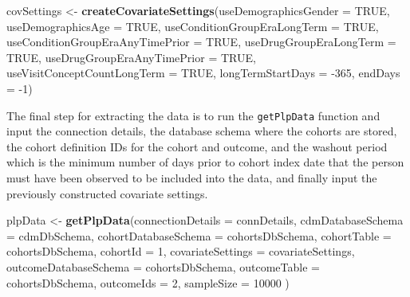 \documentclass[11pt]{book}
\newenvironment{Shaded}{\begin{snugshade}}{\end{snugshade}}
\newcommand{\DataTypeTok}[1]{\textcolor[rgb]{0.13,0.29,0.53}{#1}}
\newcommand{\DecValTok}[1]{\textcolor[rgb]{0.00,0.00,0.81}{#1}}
\newcommand{\KeywordTok}[1]{\textcolor[rgb]{0.13,0.29,0.53}{\textbf{#1}}}
\newcommand{\NormalTok}[1]{#1}
\newcommand{\OtherTok}[1]{\textcolor[rgb]{0.56,0.35,0.01}{#1}}
\newcommand{\StringTok}[1]{\textcolor[rgb]{0.31,0.60,0.02}{#1}}
\theoremstyle{definition}
\theoremstyle{definition}
\theoremstyle{definition}
\theoremstyle{remark}
\begin{document}
\begin{Shaded}
\begin{Highlighting}[]
\NormalTok{covSettings <-}\StringTok{ }\KeywordTok{createCovariateSettings}\NormalTok{(}\DataTypeTok{useDemographicsGender =} \OtherTok{TRUE}\NormalTok{,}
                                       \DataTypeTok{useDemographicsAge =} \OtherTok{TRUE}\NormalTok{,}
                                       \DataTypeTok{useConditionGroupEraLongTerm =} \OtherTok{TRUE}\NormalTok{,}
                                       \DataTypeTok{useConditionGroupEraAnyTimePrior =} \OtherTok{TRUE}\NormalTok{,}
                                       \DataTypeTok{useDrugGroupEraLongTerm =} \OtherTok{TRUE}\NormalTok{,}
                                       \DataTypeTok{useDrugGroupEraAnyTimePrior =} \OtherTok{TRUE}\NormalTok{,}
                                       \DataTypeTok{useVisitConceptCountLongTerm =} \OtherTok{TRUE}\NormalTok{,}
                                       \DataTypeTok{longTermStartDays =} \DecValTok{-365}\NormalTok{,}
                                       \DataTypeTok{endDays =} \DecValTok{-1}\NormalTok{)}
\end{Highlighting}
\end{Shaded}

The final step for extracting the data is to run the \texttt{getPlpData} function and input the connection details, the database schema where the cohorts are stored, the cohort definition IDs for the cohort and outcome, and the washout period which is the minimum number of days prior to cohort index date that the person must have been observed to be included into the data, and finally input the previously constructed covariate settings.

\begin{Shaded}
\begin{Highlighting}[]
\NormalTok{plpData <-}\StringTok{ }\KeywordTok{getPlpData}\NormalTok{(}\DataTypeTok{connectionDetails =}\NormalTok{ connDetails,}
                      \DataTypeTok{cdmDatabaseSchema =}\NormalTok{ cdmDbSchema,}
                      \DataTypeTok{cohortDatabaseSchema =}\NormalTok{ cohortsDbSchema,}
                      \DataTypeTok{cohortTable =}\NormalTok{ cohortsDbSchema,}
                      \DataTypeTok{cohortId =} \DecValTok{1}\NormalTok{,}
                      \DataTypeTok{covariateSettings =}\NormalTok{ covariateSettings,}
                      \DataTypeTok{outcomeDatabaseSchema =}\NormalTok{ cohortsDbSchema,}
                      \DataTypeTok{outcomeTable =}\NormalTok{ cohortsDbSchema,}
                      \DataTypeTok{outcomeIds =} \DecValTok{2}\NormalTok{,}
                      \DataTypeTok{sampleSize =} \DecValTok{10000}
\NormalTok{)}
\end{Highlighting}
\end{Shaded}
\end{document}
